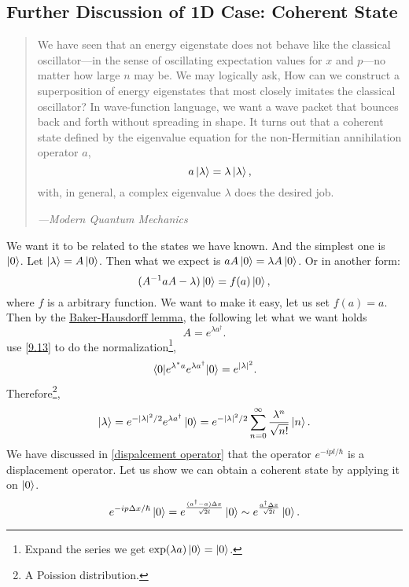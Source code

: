 \documentclass{article}
\theoremstyle{1}
\begin{document}
\subsection{Further Discussion of 1D Case: Coherent State}
\begin{quotation}
    We have seen that an energy eigenstate does not behave like the classical
oscillator—in the sense of oscillating expectation values for $x$ and $p$—no matter
how large $n$ may be. We may logically ask, How can we construct a superposition
of energy eigenstates that most closely imitates the classical oscillator? In wave-function language, we want a wave packet that bounces back and forth without
spreading in shape. It turns out that a coherent state defined by the eigenvalue
equation for the non-Hermitian annihilation operator $a$,
$$a\ket{\lambda}=\lambda\ket{\lambda},$$
with, in general, a complex eigenvalue $\lambda$ does the desired job. 
\begin{flushright}
    {\raggedleft \textit{---Modern Quantum Mechanics}}
\end{flushright}
\end{quotation}
We want it to be related to the states we have known. And the simplest one is $\ket{0}$. Let $\ket{\lambda}=A\ket{0}$. Then what we expect is $aA\ket{0}=\lambda A\ket{0}$. Or in another form:
\begin{equation*}
    (A^{-1}aA-\lambda)\ket{0}=f(a)\ket{0},
\end{equation*}
where $f$ is a arbitrary function. We want to make it easy, let us set $f(a)=a$. Then by the \hyperref[Baker-Hausdorff lemma]{Baker-Hausdorff lemma}, the following let what we want holds
\begin{equation}
    A=e^{\lambda a^\dagger}.
\end{equation}
use \eqref{9.13} to do the normalization\footnote{Expand the series we get $\exp(\lambda a)\ket{0}=\ket{0}$.},
\begin{equation}
    \expval{e^{\lambda^* a}e^{\lambda a^\dagger}}{0}=e^{\left|\lambda\right|^2}.
\end{equation}
Therefore\footnote{A Poission distribution.},
\begin{equation}
    \ket{\lambda}=e^{-\left|\lambda\right|^2/2}e^{\lambda a^\dagger}\ket{0}=e^{-\left|\lambda\right|^2/2}\sum_{n=0}^{\infty}\frac{\lambda^n}{\sqrt{n!}}\ket{n}.
\end{equation}
We have discussed in \ref{dispalcement operator} that the operator $e^{-i  pl/\hbar}$ is a displacement operator. Let us show we can obtain a coherent state by applying it on $\ket{0}$.
\begin{equation}
    e^{-ip\Delta x/\hbar}\ket{0}=e^{\frac{(a^\dagger-a)\Delta x}{\sqrt{2}l}}\ket{0}\sim e^{\frac{a^\dagger \Delta x}{\sqrt{2}l}}\ket{0}.
\end{equation}
\end{document}
